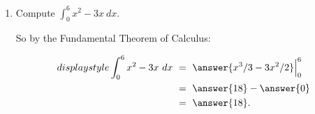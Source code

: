 \documentclass{ximera}
\begin{document}
\begin{question}
\begin{enumerate}
\item Compute $\displaystyle\int_0^6 x^2-3x\ dx$. 
\begin{explanation}
So by the Fundamental Theorem of Calculus:

\begin{align*}
displaystyle\int_0^6 x^2-3x\ dx&\ =\ \answer{x^3/3-3x^2/2}\Big|_0^6\\
&\ =\ \answer{18}-\answer{0}\\
&\ =\ \answer{18}.
\end{align*}



\end{explanation}



\end{enumerate}


\end{question}
\end{document}
